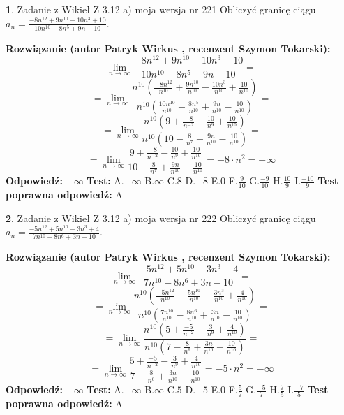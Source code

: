 \documentclass[12pt, a4paper]{article}
\theoremstyle{definition} %
\newtheorem{zad}{}
\newcommand{\zadStart}[1]{\begin{zad}#1\newline}
\newcommand{\zadStop}{\end{zad}}
\newcommand{\rozwStart}[2]{\noindent \textbf{Rozwiązanie (autor #1 , recenzent #2): }\newline}
\newcommand{\rozwStop}{\newline}
\newcommand{\odpStart}{\noindent \textbf{Odpowiedź:}\newline}
\newcommand{\odpStop}{\newline}
\newcommand{\testStart}{\noindent \textbf{Test:}\newline}
\newcommand{\testStop}{\newline}
\newcommand{\kluczStart}{\noindent \textbf{Test poprawna odpowiedź:}\newline}
\newcommand{\kluczStop}{\newline}
\begin{document}
\zadStart{Zadanie z Wikieł Z 3.12 a) moja wersja nr 221}
Obliczyć granicę ciągu $a_{n}=\frac{-8n^{12}+9n^{10}-10n^{3}+10}{10n^{10}-8n^{5}+9n-10}$.
\zadStop
\rozwStart{Patryk Wirkus}{Szymon Tokarski}
$$\lim\limits_{n\to\infty}\frac{-8n^{12}+9n^{10}-10n^{3}+10}{10n^{10}-8n^{5}+9n-10}=$$
$$=\lim\limits_{n\to\infty}\frac{n^{10}\left(\frac{-8n^{12}}{n^{10}}+\frac{9n^{10}}{n^{10}}-\frac{10n^{3}}{n^{10}}+\frac{10}{n^{10}}\right)}{n^{10}\left(\frac{10n^{10}}{n^{10}}-\frac{8n^{5}}{n^{10}}+\frac{9n}{n^{10}}-\frac{10}{n^{10}}\right)}=$$
$$=\lim\limits_{n\to\infty}\frac{n^{10}\left(9+\frac{-8}{n^{-2}}-\frac{10}{n^{9}}+\frac{10}{n^{10}}\right)}
{n^{10}\left(10-\frac{8}{n^{7}}+\frac{9n}{n^{10}}-\frac{10}{n^{10}}\right)}=$$
$$=\lim\limits_{n\to\infty}\frac{9+\frac{-8}{n^{-2}}-\frac{10}{n^{9}}+\frac{10}{n^{10}}}{10-\frac{8}{n^{7}}+\frac{9n}{n^{10}}-\frac{10}{n^{10}}}=-8\cdot n^{2} = -\infty$$
\rozwStop
\odpStart
$-\infty$
\odpStop
\testStart
A.$-\infty$
B.$\infty$
C.$8$
D.$-8$
E.$0$
F.$\frac{9}{10}$
G.$\frac{-9}{10}$
H.$\frac{10}{9}$
I.$\frac{-10}{9}$
\testStop
\kluczStart
A
\kluczStop



\zadStart{Zadanie z Wikieł Z 3.12 a) moja wersja nr 222}
Obliczyć granicę ciągu $a_{n}=\frac{-5n^{12}+5n^{10}-3n^{3}+4}{7n^{10}-8n^{6}+3n-10}$.
\zadStop
\rozwStart{Patryk Wirkus}{Szymon Tokarski}
$$\lim\limits_{n\to\infty}\frac{-5n^{12}+5n^{10}-3n^{3}+4}{7n^{10}-8n^{6}+3n-10}=$$
$$=\lim\limits_{n\to\infty}\frac{n^{10}\left(\frac{-5n^{12}}{n^{10}}+\frac{5n^{10}}{n^{10}}-\frac{3n^{3}}{n^{10}}+\frac{4}{n^{10}}\right)}{n^{10}\left(\frac{7n^{10}}{n^{10}}-\frac{8n^{6}}{n^{10}}+\frac{3n}{n^{10}}-\frac{10}{n^{10}}\right)}=$$
$$=\lim\limits_{n\to\infty}\frac{n^{10}\left(5+\frac{-5}{n^{-2}}-\frac{3}{n^{9}}+\frac{4}{n^{10}}\right)}
{n^{10}\left(7-\frac{8}{n^{6}}+\frac{3n}{n^{10}}-\frac{10}{n^{10}}\right)}=$$
$$=\lim\limits_{n\to\infty}\frac{5+\frac{-5}{n^{-2}}-\frac{3}{n^{9}}+\frac{4}{n^{10}}}{7-\frac{8}{n^{6}}+\frac{3n}{n^{10}}-\frac{10}{n^{10}}}=-5\cdot n^{2} = -\infty$$
\rozwStop
\odpStart
$-\infty$
\odpStop
\testStart
A.$-\infty$
B.$\infty$
C.$5$
D.$-5$
E.$0$
F.$\frac{5}{7}$
G.$\frac{-5}{7}$
H.$\frac{7}{5}$
I.$\frac{-7}{5}$
\testStop
\kluczStart
A
\kluczStop
\end{document}
